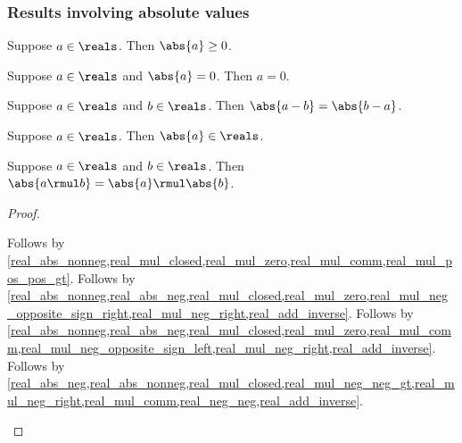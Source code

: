 \subsubsection{Results involving absolute values}

\begin{proposition}\label{real_abs_nonnegative}
    Suppose $a\in\reals$.
    Then $\abs{a} \geq 0$.
\end{proposition}

\begin{proposition}\label{real_abs_eq_zero}
    Suppose $a\in\reals$ and $\abs{a} = 0$.
    Then $a = 0$.
\end{proposition}

\begin{proposition}\label{real_abs_sub_swap}
    Suppose $a\in\reals$ and $b\in\reals$.
    Then $\abs{a - b} = \abs{b - a}$.
\end{proposition}

\begin{lemma}\label{real_abs_in_reals}
    Suppose $a\in\reals$.
    Then $\abs{a}\in\reals$.
\end{lemma}

\begin{proposition}\label{real_abs_mul}
    Suppose $a\in\reals$ and $b\in\reals$.
    Then $\abs{a \rmul b} = \abs{a} \rmul \abs{b}$.
\end{proposition}
\begin{proof}
    \begin{byCase}
        Follows by \cref{real_abs_nonneg,real_mul_closed,real_mul_zero,real_mul_comm,real_mul_pos_pos_gt}.
        Follows by \cref{real_abs_nonneg,real_abs_neg,real_mul_closed,real_mul_zero,real_mul_neg_opposite_sign_right,real_mul_neg_right,real_add_inverse}.
        Follows by \cref{real_abs_nonneg,real_abs_neg,real_mul_closed,real_mul_zero,real_mul_comm,real_mul_neg_opposite_sign_left,real_mul_neg_right,real_add_inverse}.
        Follows by \cref{real_abs_neg,real_abs_nonneg,real_mul_closed,real_mul_neg_neg_gt,real_mul_neg_right,real_mul_comm,real_neg_neg,real_add_inverse}.
    \end{byCase}
\end{proof}

